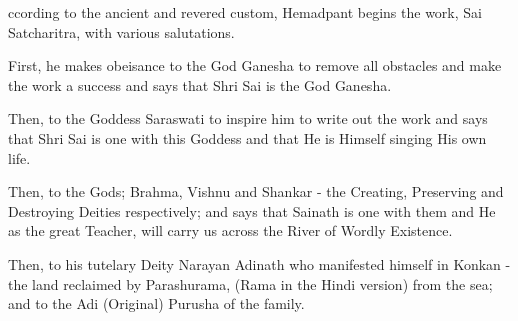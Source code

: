 \newpage
\newpage

\restoregeometry


ccording to the ancient and revered custom, Hemadpant begins the work, Sai Satcharitra, with various salutations.

First, he makes obeisance to the God Ganesha to remove all obstacles and make the work a success and says that Shri Sai is the God Ganesha.

Then, to the Goddess Saraswati to inspire him to write out the work and says that Shri Sai is one with this Goddess and that He is Himself singing His own life.

Then, to the Gods; Brahma, Vishnu and Shankar - the Creating, Preserving and Destroying Deities respectively; and says that Sainath is one with them and He as the great Teacher, will carry us across the River of Wordly Existence.

Then, to his tutelary Deity Narayan Adinath who manifested himself in Konkan - the land reclaimed by Parashurama, (Rama in the Hindi version) from the sea; and to the Adi (Original) Purusha of the family.

